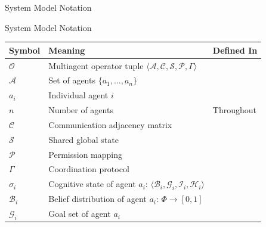 \documentclass[
  ignorenonframetext,
]{beamer}
\newcounter{none} %
\providecommand{\cref}[1]{\texttt{\detokenize{#1}}}
\begin{document}
\begin{frame}[allowframebreaks]{System Model Notation}
\protect{}\label{system-model-notation}
\end{frame}

\begin{frame}[allowframebreaks]{System Model Notation}
{\def\LTcaptype{none} %
\begin{longtable}[]{@{}
  >{\raggedright\arraybackslash}p{}
  >{\raggedright\arraybackslash}p{}
  >{\raggedright\arraybackslash}p{}@{}}
\toprule\noalign{}
\begin{minipage}[b]{\linewidth}\raggedright
Symbol
\end{minipage} & \begin{minipage}[b]{\linewidth}\raggedright
Meaning
\end{minipage} & \begin{minipage}[b]{\linewidth}\raggedright
Defined In
\end{minipage} \\
\midrule\noalign{}
\endhead
\(\mathcal{O}\) & Multiagent operator tuple
\(\langle \mathcal{A}, \mathcal{C}, \mathcal{S}, \mathcal{P}, \Gamma \rangle\)
& \cref{def:multiagent-operator} \\
\(\mathcal{A}\) & Set of agents \(\{a_1, \ldots, a_n\}\) &
\cref{tab:operator-components} \\
\(a_i\) & Individual agent \(i\) & \cref{def:multiagent-operator} \\
\(n\) & Number of agents & Throughout \\
\(\mathcal{C}\) & Communication adjacency matrix &
\cref{tab:operator-components} \\
\(\mathcal{S}\) & Shared global state &
\cref{def:multiagent-operator} \\
\(\mathcal{P}\) & Permission mapping & \cref{def:permission-layer} \\
\(\Gamma\) & Coordination protocol & \cref{def:multiagent-operator} \\
\(\sigma_i\) & Cognitive state of agent \(a_i\):
\(\langle \mathcal{B}_i, \mathcal{G}_i, \mathcal{I}_i, \mathcal{H}_i \rangle\)
& \cref{def:cognitive-state} \\
\(\mathcal{B}_i\) & Belief distribution of agent \(a_i\):
\(\Phi \to [0,1]\) & \cref{tab:cognitive-components} \\
\(\mathcal{G}_i\) & Goal set of agent \(a_i\) &

\end{longtable}}
\end{frame}
\end{document}
